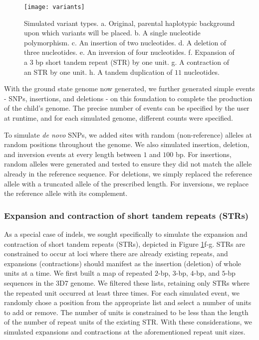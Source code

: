 \begin{figure}[h!]
  \centering
    \texttt{[image: variants]}
  \caption{Simulated variant types.  a. Original, parental haplotypic background upon which variants will be placed.  b. A single nucleotide polymorphism.  c. An insertion of two nucleotides.  d. A deletion of three nucleotides.  e. An inversion of four nucleotides.  f. Expansion of a $3$ bp short tandem repeat (STR) by one unit.  g. A contraction of an STR by one unit.  h. A tandem duplication of $11$ nucleotides.}
  \label{fig:variants}
\end{figure}

With the ground state genome now generated, we further generated simple events - SNPs, insertions, and deletions - on this foundation to complete the production of the child's genome.  The precise number of events can be specified by the user at runtime, and for each simulated genome, different counts were specified.

To simulate \textit{de novo} SNPs, we added sites with random (non-reference) alleles at random positions throughout the genome.  We also simulated insertion, deletion, and inversion events at every length between $1$ and $100$ bp. For insertions, random alleles were generated and tested to ensure they did not match the allele already in the reference sequence. For deletions, we simply replaced the reference allele with a truncated allele of the prescribed length. For inversions, we replace the reference allele with its complement.

\subsubsection{Expansion and contraction of short tandem repeats (STRs)}

As a special case of indels, we sought specifically to simulate the expansion and contraction of short tandem repeats (STRs), depicted in Figure \ref{fig:variants}f-g. STRs are constrained to occur at loci where there are already existing repeats, and expansions (contractions) should manifest as the insertion (deletion) of whole units at a time.  We first built a map of repeated $2$-bp, $3$-bp, $4$-bp, and $5$-bp sequences in the 3D7 genome. We filtered these lists, retaining only STRs where the repeated unit occurred at least three times. For each simulated event, we randomly chose a position from the appropriate list and select a number of units to add or remove. The number of units is constrained to be less than the length of the number of repeat units of the existing STR. With these considerations, we simulated expansions and contractions at the aforementioned repeat unit sizes.

